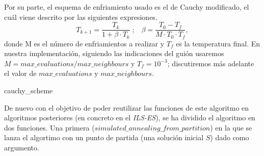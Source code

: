 \documentclass[11pt,a4paper]{article}
\begin{document}
	Por su parte, el esquema de enfriamiento usado es el de Cauchy modificado, el cuál viene descrito por las siguientes expresiones.
	$$T_{k+1} = \frac{T_k}{1+ \beta \cdot T_k} \;;\;\;\; \beta = \frac{T_0-T_f}{M\cdot T_0 \cdot T_f},$$
	donde M es el número de enfriamientos a realizar y $T_f$ es la temperatura final. En nuestra implementación, siguiendo las indicaciones del guión usaremos $M= max\_evaluations / max\_neighbours$ y $T_f= 10^{-3}$; discutiremos más adelante el valor de $max\_evaluations$ y $max\_neighbours$.
	
	\begin{algorithm}[H]
	 	\caption{cauchy\_scheme}
	\end{algorithm}
	De nuevo con el objetivo de poder reutilizar las funciones de este algoritmo en algoritmos posteriores (en concreto en el \textit{ILS-ES}), se ha dividido el algoritmo en dos funciones. Una primera ($simulated\_annealing\_from\_partition$) en la que se lanza el algortimo con un punto de partida (una solución inicial $S$) dado como argumento. \\ 
\end{document}
